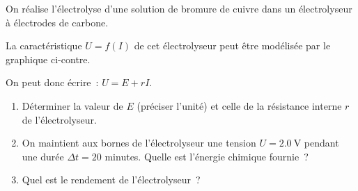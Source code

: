 On réalise l’électrolyse d’une solution de bromure de cuivre dans un
électrolyseur à électrodes de carbone.

La caractéristique $U=f(I)$ de cet électrolyseur peut être modélisée par le
graphique ci-contre.

On peut donc écrire~: $U=E+r I$.

\begin{figure}[H]
    \centering
\end{figure}

\begin{enumerate}
    \item Déterminer la valeur de $E$ (préciser l'unité) et celle de la
          résistance interne $r$ de l'électrolyseur.
    \item On maintient aux bornes de l'électrolyseur une tension
          $U=\qty{2,0}{\volt}$ pendant une durée $\Delta t=20$ minutes.
          Quelle est l'énergie chimique fournie~?
    \item Quel est le rendement de l'électrolyseur~?
\end{enumerate}


